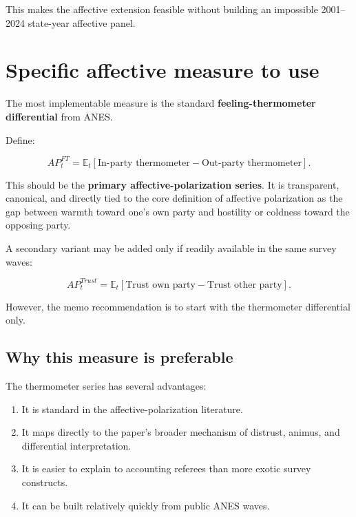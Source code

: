 \documentclass[12pt]{article}
\begin{document}
This makes the affective extension feasible without building an impossible 2001--2024 state-year affective panel.

\section{Specific affective measure to use}

The most implementable measure is the standard \textbf{feeling-thermometer differential} from ANES.

Define:

\begin{equation}
AP^{FT}_t = \mathbb{E}_t\left[\text{In-party thermometer} - \text{Out-party thermometer}\right].
\end{equation}

This should be the \textbf{primary affective-polarization series}. It is transparent, canonical, and directly tied to the core definition of affective polarization as the gap between warmth toward one's own party and hostility or coldness toward the opposing party.

A secondary variant may be added only if readily available in the same survey waves:

\begin{equation}
AP^{Trust}_t = \mathbb{E}_t\left[\text{Trust own party} - \text{Trust other party}\right].
\end{equation}

However, the memo recommendation is to start with the thermometer differential only.

\subsection{Why this measure is preferable}

The thermometer series has several advantages:
\begin{enumerate}[leftmargin=1.5em]
    \item It is standard in the affective-polarization literature.
    \item It maps directly to the paper's broader mechanism of distrust, animus, and differential interpretation.
    \item It is easier to explain to accounting referees than more exotic survey constructs.
    \item It can be built relatively quickly from public ANES waves.
\end{enumerate}
\end{document}
